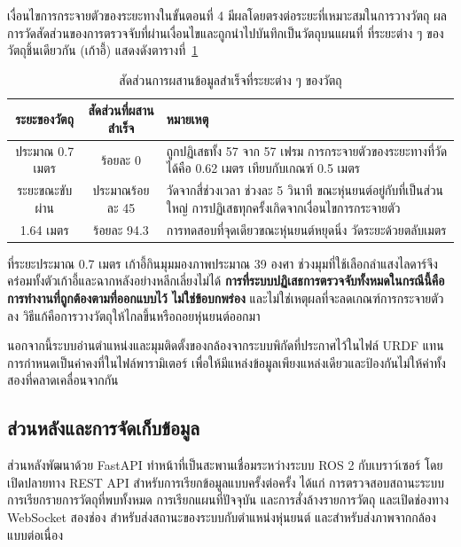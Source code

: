 \documentclass[a4paper,12pt]{report}
\begin{document}
เงื่อนไขการกระจายตัวของระยะทางในขั้นตอนที่ 4 มีผลโดยตรงต่อระยะที่เหมาะสมในการวางวัตถุ
ผลการวัดสัดส่วนของการตรวจจับที่ผ่านเงื่อนไขและถูกนำไปบันทึกเป็นวัตถุบนแผนที่
ที่ระยะต่าง ๆ ของวัตถุชิ้นเดียวกัน (เก้าอี้) แสดงดังตารางที่~\ref{tab:fuserange}

\begin{table}[H]
\centering
\caption[สัดส่วนการผสานข้อมูลสำเร็จที่ระยะต่าง ๆ ของวัตถุ (บทที่ 4)]{สัดส่วนการผสานข้อมูลสำเร็จที่ระยะต่าง ๆ ของวัตถุ}
\label{tab:fuserange}
\small
\begin{tabularx}{\textwidth}{|c|c|X|}
\hline
\textbf{ระยะของวัตถุ} & \textbf{สัดส่วนที่ผสานสำเร็จ} & \textbf{หมายเหตุ} \\
\hline
ประมาณ 0.7 เมตร & ร้อยละ 0 & ถูกปฏิเสธทั้ง 57 จาก 57 เฟรม
  การกระจายตัวของระยะทางที่วัดได้คือ 0.62 เมตร เทียบกับเกณฑ์ 0.5 เมตร \\
\hline
ระยะขณะขับผ่าน & ประมาณร้อยละ 45 & วัดจากสี่ช่วงเวลา ช่วงละ 5 วินาที
  ขณะหุ่นยนต์อยู่กับที่เป็นส่วนใหญ่ การปฏิเสธทุกครั้งเกิดจากเงื่อนไขการกระจายตัว \\
\hline
1.64 เมตร & ร้อยละ 94.3 & การทดสอบที่จุดเดียวขณะหุ่นยนต์หยุดนิ่ง วัดระยะด้วยตลับเมตร \\
\hline
\end{tabularx}
\end{table}

ที่ระยะประมาณ 0.7 เมตร เก้าอี้กินมุมมองภาพประมาณ 39 องศา
ช่วงมุมที่ใช้เลือกลำแสงไลดาร์จึงคร่อมทั้งตัวเก้าอี้และฉากหลังอย่างหลีกเลี่ยงไม่ได้
\textbf{การที่ระบบปฏิเสธการตรวจจับทั้งหมดในกรณีนี้คือการทำงานที่ถูกต้องตามที่ออกแบบไว้
ไม่ใช่ข้อบกพร่อง} และไม่ใช่เหตุผลที่จะลดเกณฑ์การกระจายตัวลง
วิธีแก้คือการวางวัตถุให้ไกลขึ้นหรือถอยหุ่นยนต์ออกมา

นอกจากนี้ระบบอ่านตำแหน่งและมุมติดตั้งของกล้องจากระบบพิกัดที่ประกาศไว้ในไฟล์ URDF
แทนการกำหนดเป็นค่าคงที่ในไฟล์พารามิเตอร์
เพื่อให้มีแหล่งข้อมูลเพียงแหล่งเดียวและป้องกันไม่ให้ค่าทั้งสองที่คลาดเคลื่อนจากกัน


\subsection{ส่วนหลังและการจัดเก็บข้อมูล}

ส่วนหลังพัฒนาด้วย FastAPI ทำหน้าที่เป็นสะพานเชื่อมระหว่างระบบ ROS 2 กับเบราว์เซอร์
โดยเปิดปลายทาง REST API สำหรับการเรียกข้อมูลแบบครั้งต่อครั้ง ได้แก่
การตรวจสอบสถานะระบบ การเรียกรายการวัตถุที่พบทั้งหมด การเรียกแผนที่ปัจจุบัน
และการสั่งล้างรายการวัตถุ และเปิดช่องทาง WebSocket สองช่อง
สำหรับส่งสถานะของระบบกับตำแหน่งหุ่นยนต์ และสำหรับส่งภาพจากกล้องแบบต่อเนื่อง
\end{document}
